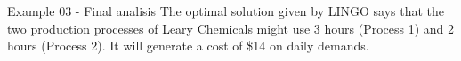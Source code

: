 \begin{frame}{Example 03 - Final analisis}
The optimal solution given by LINGO says that the two production processes of Leary Chemicals
might use 3 hours (Process 1) and 2 hours (Process 2). It will generate a cost of \$14  on daily demands.
\end{frame}
